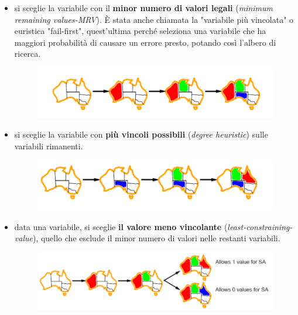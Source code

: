 \begin{itemize}
    \item si sceglie la variabile con il \textbf{minor numero di valori legali}
          (\textit{minimum remaining values-MRV}). È stata anche chiamata la "variabile più
          vincolata" o euristica "fail-first", quest'ultima perché seleziona una
          variabile che ha maggiori probabilità di causare un errore presto, potando
          così l'albero di ricerca.
          \begin{figure}[H]
              \centering
              \includegraphics[width=12cm, keepaspectratio]{img/Cap2/m1.png}
          \end{figure}
    \item si sceglie la variabile con \textbf{più vincoli possibili} (\textit{degree
              heuristic}) sulle variabili rimanenti.
          \begin{figure}[H]
              \centering
              \includegraphics[width=12cm, keepaspectratio]{img/Cap2/m2.png}
          \end{figure}
    \item data una variabile, si sceglie \textbf{il valore meno vincolante}
          (\textit{least-constraining-value}), quello che esclude il minor numero di valori
          nelle restanti variabili.
          \begin{figure}[H]
              \centering
              \includegraphics[width=12cm, keepaspectratio]{img/Cap2/m3.png}
          \end{figure}
\end{itemize}

